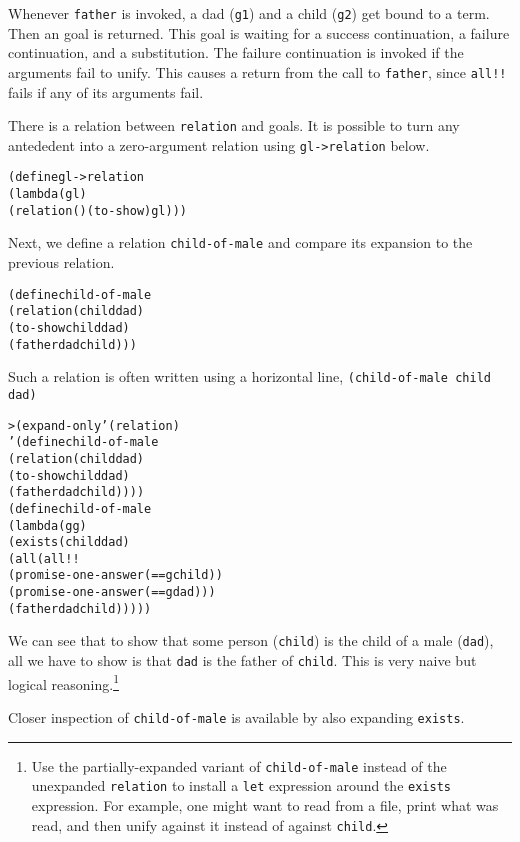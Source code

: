 Whenever \texttt{father} is invoked, a dad (\texttt{g1}) and a child
(\texttt{g2}) get bound to a term.  Then an goal is returned.
This goal is waiting for a success continuation, a failure
continuation, and a substitution.  The failure continuation is invoked
if the arguments fail to unify.  This causes a return from the call
to \texttt{father}, since \texttt{all!!} fails if any of its arguments
fail.

There is a relation between \texttt{relation} and goals.
It is possible to turn any antededent into a zero-argument
relation using \texttt{gl->relation} below.

\begin{alltt}
(define gl->relation
  (lambda (gl)
    (relation () (to-show) gl)))
\end{alltt}

Next, we define a relation \texttt{child-of-male} and compare its expansion
to the previous relation.

\begin{alltt}
(define child-of-male
  (relation (child dad)
    (to-show child dad)
    (father dad child)))
\end{alltt}

Such a relation is often written using a horizontal line,
 {\texttt{(child-of-male child dad)}}{}

\begin{alltt}
> (expand-only '(relation)
    '(define child-of-male
       (relation (child dad)
         (to-show child dad)
         (father dad child))))
(define child-of-male
  (lambda (g g)
    (exists (child dad)
      (all (all!!
             (promise-one-answer (== g child))
             (promise-one-answer (== g dad)))
           (father dad child)))))
\end{alltt}

We can see that to show that some person (\texttt{child}) is the child
of a male (\texttt{dad}), all we have to show is that \texttt{dad} is the
father of \texttt{child}.  This is very naive but logical
reasoning.\footnote{Use the partially-expanded variant of
\texttt{child-of-male} instead of the unexpanded \texttt{relation} to
install a \texttt{let} expression around the \texttt{exists}
expression.  For example, one might want to read from a file, print
what was read, and then unify against it instead of against
\texttt{child}.}

Closer inspection of \texttt{child-of-male} is available by also
expanding \texttt{exists}.

